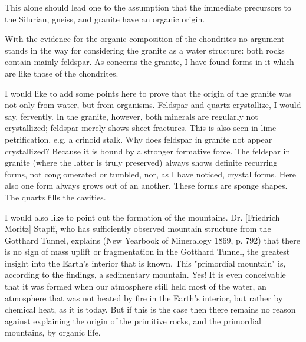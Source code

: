 \documentclass[a4paper, 11pt, oneside]{article}
\begin{document}
This alone should lead one to the assumption that the immediate precursors to the Silurian, gneiss, and granite have an organic origin.

With the evidence for the organic composition of the chondrites no argument stands in the way for considering the granite as a water structure: both rocks contain mainly feldspar. As concerns the granite, I have found forms in it which are like those of the chondrites.

I would like to add some points here to prove that the origin of the granite was not only from water, but from organisms. Feldspar and quartz crystallize, I would say, fervently. In the granite, however, both minerals are regularly not crystallized; feldspar merely shows sheet fractures. This is also seen in lime petrification, e.g. a crinoid stalk. Why does feldspar in granite not appear crystallized? Because it is bound by a stronger formative force. The feldspar in granite (where the latter is truly preserved) always shows definite recurring forms, not conglomerated or tumbled, nor, as I have noticed, crystal forms. Here also one form always grows out of an another. These forms are sponge shapes. The quartz fills the cavities.

I would also like to point out the formation of the mountains. Dr. [Friedrich Moritz] Stapff, who has sufficiently observed mountain structure from the Gotthard Tunnel, explains (New Yearbook of Mineralogy 1869, p. 792) that there is no sign of mass uplift or fragmentation in the Gotthard Tunnel, the greatest insight into the Earth's interior that is known. This "primordial mountain" is, according to the findings, a sedimentary mountain. Yes! It is even conceivable that it was formed when our atmosphere still held most of the water, an atmosphere that was not heated by fire in the Earth's interior, but rather by chemical heat, as it is today. But if this is the case then there remains no reason against explaining the origin of the primitive rocks, and the primordial mountains, by organic life.
\end{document}
